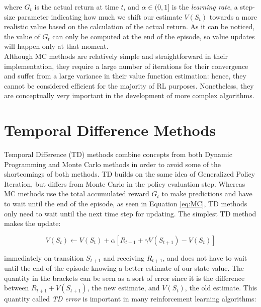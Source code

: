 where $G_t$ is the actual return at time $t$, and $\alpha \in (0,1]$ is the \textit{learning rate}, a step-size parameter indicating how much we shift our estimate $V(S_t)$ towards a more realistic value based on the calculation of the actual return. As it can be noticed, the value of $G_t$ can only be computed at the end of the episode, so value updates will happen only at that moment.
\\
\indent Although MC methods are relatively simple and straightforward in their implementation, they require a large number of iterations for their convergence and suffer from a large variance in their value function estimation: hence, they cannot be considered efficient for the majority of RL purposes. Nonetheless, they are conceptually very important in the development of more complex algorithms.

\section{Temporal Difference Methods}

Temporal Difference (TD) methods combine concepts from both Dynamic Programming and Monte Carlo methods in order to avoid some of the shortcomings of both methods. TD builds on the same idea of Generalized Policy Iteration, but differs from Monte Carlo in the policy evaluation step. Whereas MC methods use the total accumulated reward $G_t$ to make predictions and have to wait until the end of the episode, as seen in Equation \ref{eq:MC}, TD methods only need to wait until the next time step for updating. The simplest TD method makes the update:

\begin{equation}
V(S_t) \gets V(S_t) + \alpha[R_{t+1} + \gamma V(S_{t+1}) - V(S_t)]
\label{eq:TD}
\end{equation}

immediately on transition $S_{t+1}$ and receiving $R_{t+1}$, and does not have to wait until the end of the episode knowing a better estimate of our state value. The quantity in the brackets can be seen as a sort of error since it is the difference between $R_{t+1} + V(S_{t+1})$, the new estimate, and $V(S_t)$, the old estimate. This quantity called \textit{TD error} is important in many reinforcement learning algorithms:

